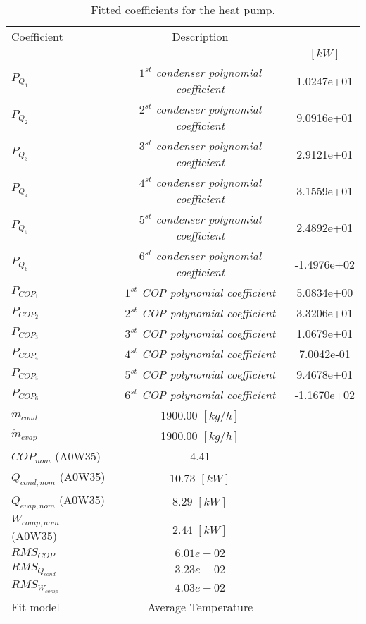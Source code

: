 \documentclass[english]{SPFShortReport}
\author{Dani Carbonell}
\begin{document}
\begin{table}[!ht]
\begin{small}
\caption{Fitted coefficients for the heat pump.}
\begin{center}
\resizebox{12cm}{!} 
{
\begin{tabular}{l | c c } 
\hline
\hline
Coefficient &Description & \\ 
 & &$[kW]$\\ 
\hline
$P_{Q_{1}}$ & \emph{$1^{st}$ condenser polynomial coefficient}  & 1.0247e+01    \\ 
$P_{Q_{2}}$ & \emph{$2^{st}$ condenser polynomial coefficient}  & 9.0916e+01    \\ 
$P_{Q_{3}}$ & \emph{$3^{st}$ condenser polynomial coefficient}  & 2.9121e+01    \\ 
$P_{Q_{4}}$ & \emph{$4^{st}$ condenser polynomial coefficient}  & 3.1559e+01    \\ 
$P_{Q_{5}}$ & \emph{$5^{st}$ condenser polynomial coefficient}  & 2.4892e+01    \\ 
$P_{Q_{6}}$ & \emph{$6^{st}$ condenser polynomial coefficient}  & -1.4976e+02    \\ 
\hline
$P_{COP_{1}}$ & \emph{$1^{st}$ COP polynomial coefficient}  & 5.0834e+00    \\ 
$P_{COP_{2}}$ & \emph{$2^{st}$ COP polynomial coefficient}  & 3.3206e+01    \\ 
$P_{COP_{3}}$ & \emph{$3^{st}$ COP polynomial coefficient}  & 1.0679e+01    \\ 
$P_{COP_{4}}$ & \emph{$4^{st}$ COP polynomial coefficient}  & 7.0042e-01    \\ 
$P_{COP_{5}}$ & \emph{$5^{st}$ COP polynomial coefficient}  & 9.4678e+01    \\ 
$P_{COP_{6}}$ & \emph{$6^{st}$ COP polynomial coefficient}  & -1.1670e+02    \\ 
\hline
$\dot m_{cond}$ & 1900.00 $[kg/h]$ \\ 
$\dot m_{evap}$ & 1900.00 $[kg/h]$ \\ 
\hline
$COP_{nom}$ (A0W35)& 4.41 \\ 
$Q_{cond,nom}$ (A0W35)& 10.73 $[kW]$\\ 
$Q_{evap,nom}$ (A0W35)& 8.29 $[kW]$\\ 
$W_{comp,nom}$ (A0W35)& 2.44 $[kW]$\\ 
\hline
 $RMS_{COP}$ & $6.01e-02$ \\ 
 $RMS_{Q_{cond}}$ & $3.23e-02$ \\ 
 $RMS_{W_{comp}}$ & $4.03e-02$ \\ 
\hline
Fit model & Average Temperature\\ 
\hline
\hline
\end{tabular}
}
\label{CoefTable}
\end{center}
\end{small}
\end{table}
\end{document}
